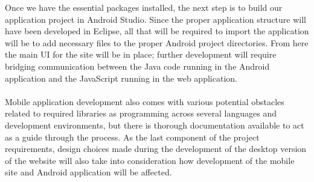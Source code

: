 \documentclass[letterpaper,10pt, draftclsnofoot,onecolumn]{IEEEtran}
\begin{document}
{{{Once we have the essential packages installed, the next step is to build our application project in Android Studio.
Since the proper application structure will have been developed in Eclipse, all that will be required to import the application will be to add necessary files to the proper Android project directories. 
From here the main UI for the site will be in place; further development will require bridging communication between the Java code running in the Android application and the JavaScript running in the web application. 
\\ \\
Mobile application development also comes with various potential obstacles related to required libraries as programming across several languages and development environments, but there is thorough documentation available to act as a guide through the process. 
As the last component of the project requirements, design choices made during the development of the desktop version of the website will also take into consideration how development of the mobile site and Android application will be affected.
}

}}
\end{document}
